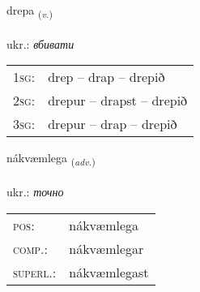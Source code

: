 \documentclass[frontgrid, backgrid]{flacards}\usepackage[]{graphicx}\usepackage[]{xcolor}
\begin{document}
\renewcommand{\flhead}{\vskip5pt \fboxsep=0pt {\small\bfseries\footnotesize Sagnorð | дієслово}}
\renewcommand{\fcfoot}{\vskip5pt \fboxsep=0pt \hspace{2pt}{\small\bfseries\footnotesize 2K}}

\renewcommand{\blhead}{\vskip5pt {\small\bfseries\footnotesize Sagnorð | дієслово }}
\renewcommand{\bcfoot}{\vskip5pt \hspace{2pt}{\small\bfseries\footnotesize 2K}}


{drepa \small{\textsubscript{(\textit{v.})}} \\[1ex] %
\textphonetic{[trɛːpa]} \\
ukr.: \emph{вбивати} \\  [2ex]
\renewcommand*{\arraystretch}{0.8}
\begin{tabular}{p{1cm}l}
\textsc{1sg}: & drep -- drap -- drepið \\ 
\textsc{2sg}: & drepur -- drapst -- drepið \\ 
\textsc{3sg}: & drepur -- drap -- drepið \\ 
\end{tabular}
}

\renewcommand{\flhead}{\vskip5pt \fboxsep=0pt {\small\bfseries\footnotesize Atviksorð | прислівник}}
\renewcommand{\fcfoot}{\vskip5pt \fboxsep=0pt \hspace{2pt}{\small\bfseries\footnotesize 2K}}

\renewcommand{\blhead}{\vskip5pt {\small\bfseries\footnotesize Atviksorð | прислівник }}
\renewcommand{\bcfoot}{\vskip5pt \hspace{2pt}{\small\bfseries\footnotesize 2K}}


{nákvæmlega \small{\textsubscript{(\textit{adv.})}} \\[1ex] %
\textphonetic{[nauːkʰvaimlɛɣa]} \\
ukr.: \emph{точно} \\  [2ex]
\renewcommand*{\arraystretch}{0.8}
\begin{tabular}{ll}
\textsc{pos}: & nákvæmlega \\ 
\textsc{comp.}: & nákvæmlegar \\ 
\textsc{superl.}: & nákvæmlegast \\
\end{tabular}
}
\end{document}
